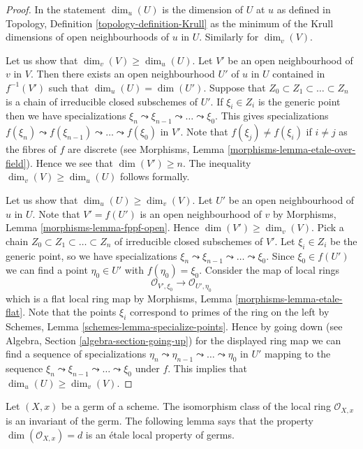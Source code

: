 \begin{proof}
In the statement $\dim_u(U)$ is the dimension of $U$ at $u$ as defined in
Topology, Definition \ref{topology-definition-Krull}
as the minimum of the Krull dimensions of open neighbourhoods of $u$ in $U$.
Similarly for $\dim_v(V)$.

\medskip\noindent
Let us show that $\dim_v(V) \geq \dim_u(U)$.
Let $V'$ be an open neighbourhood of $v$ in $V$.
Then there exists an open neighbourhood $U'$ of $u$ in $U$
contained in $f^{-1}(V')$ such that $\dim_u(U) = \dim(U')$. Suppose that
$Z_0 \subset Z_1 \subset \ldots \subset Z_n$ is a chain of irreducible
closed subschemes of $U'$. If $\xi_i \in Z_i$ is the generic point
then we have specializations
$\xi_n \leadsto \xi_{n - 1} \leadsto \ldots \leadsto \xi_0$.
This gives specializations
$f(\xi_n) \leadsto f(\xi_{n - 1}) \leadsto \ldots \leadsto f(\xi_0)$
in $V'$. Note that $f(\xi_j) \not = f(\xi_i)$ if $i \not = j$ as
the fibres of $f$ are discrete (see
Morphisms, Lemma \ref{morphisms-lemma-etale-over-field}).
Hence we see that $\dim(V') \geq n$. The inequality
$\dim_v(V) \geq \dim_u(U)$ follows formally.

\medskip\noindent
Let us show that $\dim_u(U) \geq \dim_v(V)$.
Let $U'$ be an open neighbourhood of $u$ in $U$.
Note that $V' = f(U')$ is an open neighbourhood of $v$ by
Morphisms, Lemma \ref{morphisms-lemma-fppf-open}.
Hence $\dim(V') \geq \dim_v(V)$. Pick a chain
$Z_0 \subset Z_1 \subset \ldots \subset Z_n$ of irreducible
closed subschemes of $V'$. Let $\xi_i \in Z_i$ be the generic point,
so we have specializations
$\xi_n \leadsto \xi_{n - 1} \leadsto \ldots \leadsto \xi_0$.
Since $\xi_0 \in f(U')$ we can find a point $\eta_0 \in U'$
with $f(\eta_0) = \xi_0$. Consider the map of local rings
$$
\mathcal{O}_{V', \xi_0} \longrightarrow \mathcal{O}_{U', \eta_0}
$$
which is a flat local ring map by
Morphisms, Lemma \ref{morphisms-lemma-etale-flat}.
Note that the points $\xi_i$ correspond to primes of the ring on the left by
Schemes, Lemma \ref{schemes-lemma-specialize-points}.
Hence by going down (see
Algebra, Section \ref{algebra-section-going-up})
for the displayed ring map we can find a sequence of specializations
$\eta_n \leadsto \eta_{n - 1} \leadsto \ldots \leadsto \eta_0$
in $U'$ mapping to the sequence
$\xi_n \leadsto \xi_{n - 1} \leadsto \ldots \leadsto \xi_0$
under $f$. This implies that $\dim_u(U) \geq \dim_v(V)$.
\end{proof}

Let $(X, x)$ be a germ of a scheme.
The isomorphism class of the local ring $\mathcal{O}_{X, x}$
is an invariant of the germ. The following lemma says that the
property $\dim(\mathcal{O}_{X, x}) = d$ is an \'etale local property
of germs.

